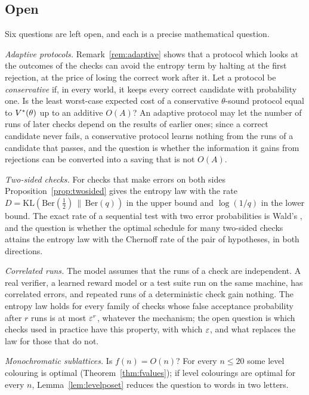 \subsection{Open}

Six questions are left open, and each is a precise mathematical question.

\emph{Adaptive protocols.} Remark~\ref{rem:adaptive} shows that a protocol which looks at the outcomes of the checks can avoid the entropy term by halting at the first rejection, at the price of losing the correct work after it. Let a protocol be \emph{conservative} if, in every world, it keeps every correct candidate with probability one. Is the least worst-case expected cost of a conservative $\theta$-sound protocol equal to $V^{*}(\theta)$ up to an additive $O(A)$? An adaptive protocol may let the number of runs of later checks depend on the results of earlier ones; since a correct candidate never fails, a conservative protocol learns nothing from the runs of a candidate that passes, and the question is whether the information it gains from rejections can be converted into a saving that is not $O(A)$.

\emph{Two-sided checks.} For checks that make errors on both sides Proposition~\ref{prop:twosided} gives the entropy law with the rate $D=\mathrm{KL}(\mathrm{Ber}(\frac12)\,\|\,\mathrm{Ber}(q))$ in the upper bound and $\log(1/q)$ in the lower bound. The exact rate of a sequential test with two error probabilities is Wald's \cite{Wal45}, and the question is whether the optimal schedule for many two-sided checks attains the entropy law with the Chernoff rate of the pair of hypotheses, in both directions.

\emph{Correlated runs.} The model assumes that the runs of a check are independent. A real verifier, a learned reward model or a test suite run on the same machine, has correlated errors, and repeated runs of a deterministic check gain nothing. The entropy law holds for every family of checks whose false acceptance probability after $r$ runs is at most $\varepsilon^{r}$, whatever the mechanism; the open question is which checks used in practice have this property, with which $\varepsilon$, and what replaces the law for those that do not.

\emph{Monochromatic sublattices.} Is $f(n)=O(n)$? For every $n\le20$ some level colouring is optimal (Theorem~\ref{thm:fvalues}); if level colourings are optimal for every $n$, Lemma~\ref{lem:levelposet} reduces the question to words in two letters.

